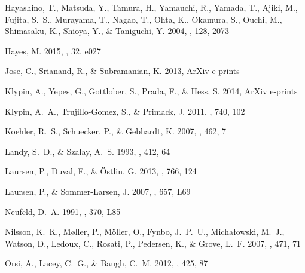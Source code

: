 \documentclass{emulateapj}
\begin{document}
\begin{thebibliography}{39}
{Hayashino}, T., {Matsuda}, Y., {Tamura}, H., {Yamauchi}, R., {Yamada}, T.,
  {Ajiki}, M., {Fujita}, S.~S., {Murayama}, T., {Nagao}, T., {Ohta}, K.,
  {Okamura}, S., {Ouchi}, M., {Shimasaku}, K., {Shioya}, Y., \& {Taniguchi}, Y.
  2004, \aj, 128, 2073

{Hayes}, M. 2015, \pasa, 32, e027

{Jose}, C., {Srianand}, R., \& {Subramanian}, K. 2013, ArXiv e-prints

{Klypin}, A., {Yepes}, G., {Gottlober}, S., {Prada}, F., \& {Hess}, S. 2014,
  ArXiv e-prints

{Klypin}, A.~A., {Trujillo-Gomez}, S., \& {Primack}, J. 2011, \apj, 740, 102

{Koehler}, R.~S., {Schuecker}, P., \& {Gebhardt}, K. 2007, \aap, 462, 7

{Landy}, S.~D., \& {Szalay}, A.~S. 1993, \apj, 412, 64

{Laursen}, P., {Duval}, F., \& {{\"O}stlin}, G. 2013, \apj, 766, 124

{Laursen}, P., \& {Sommer-Larsen}, J. 2007, \apjl, 657, L69

{Neufeld}, D.~A. 1991, \apjl, 370, L85

{Nilsson}, K.~K., {M{\o}ller}, P., {M{\"o}ller}, O., {Fynbo}, J.~P.~U.,
  {Micha{\l}owski}, M.~J., {Watson}, D., {Ledoux}, C., {Rosati}, P.,
  {Pedersen}, K., \& {Grove}, L.~F. 2007, \aap, 471, 71

{Orsi}, A., {Lacey}, C.~G., \& {Baugh}, C.~M. 2012, \mnras, 425, 87


\end{thebibliography}
\end{document}
